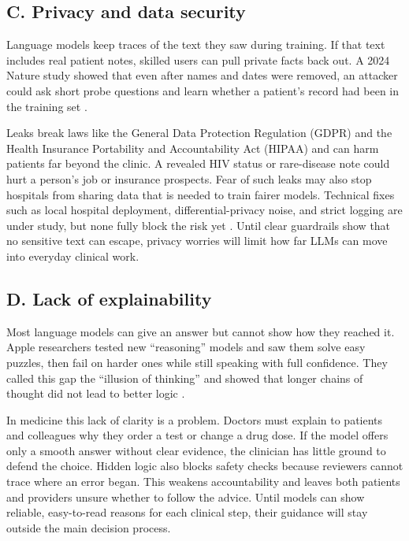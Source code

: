 \documentclass[12pt,a4paper]{scrreprt}
\begin{document}
\subsection*{C. Privacy and data security}
Language models keep traces of the text they saw during training. If that text includes real patient notes, skilled users can pull private facts back out. A 2024 Nature study showed that even after names and dates were removed, an attacker could ask short probe questions and learn whether a patient’s record had been in the training set \autocite{Privacy}.\par
\vspace{\baselineskip}
\noindent
Leaks break laws like the General Data Protection Regulation (GDPR) and the Health Insurance Portability and Accountability Act (HIPAA) and can harm patients far beyond the clinic. A revealed HIV status or rare-disease note could hurt a person’s job or insurance prospects. Fear of such leaks may also stop hospitals from sharing data that is needed to train fairer models. Technical fixes such as local hospital deployment, differential-privacy noise, and strict logging are under study, but none fully block the risk yet \autocite{Privacy2}. Until clear guardrails show that no sensitive text can escape, privacy worries will limit how far LLMs can move into everyday clinical work.


\subsection*{D. Lack of explainability}
Most language models can give an answer but cannot show how they reached it. Apple researchers tested new “reasoning” models and saw them solve easy puzzles, then fail on harder ones while still speaking with full confidence. They called this gap the “illusion of thinking” and showed that longer chains of thought did not lead to better logic \autocite{Apple}.\par
\vspace{\baselineskip}
\noindent
In medicine this lack of clarity is a problem. Doctors must explain to patients and colleagues why they order a test or change a drug dose. If the model offers only a smooth answer without clear evidence, the clinician has little ground to defend the choice. Hidden logic also blocks safety checks because reviewers cannot trace where an error began. This weakens accountability and leaves both patients and providers unsure whether to follow the advice. Until models can show reliable, easy-to-read reasons for each clinical step, their guidance will stay outside the main decision process.
\end{document}
